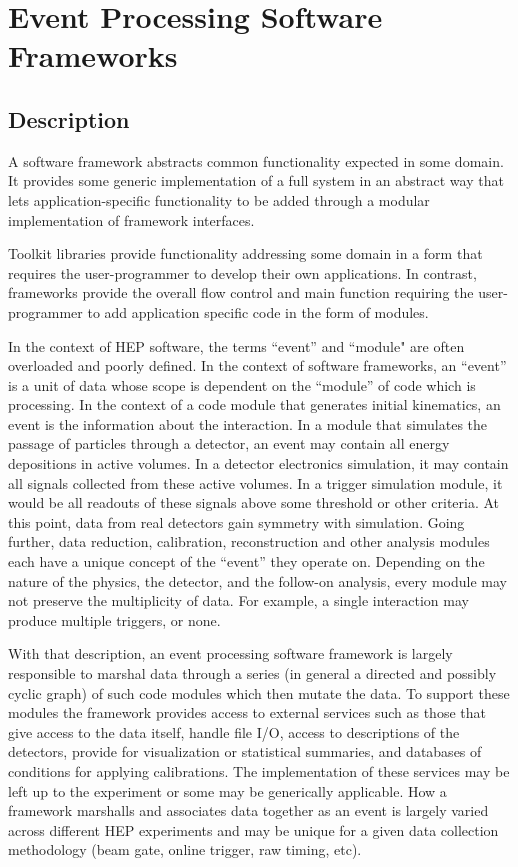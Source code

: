 \section{Event Processing Software Frameworks}

\subsection{Description}

A software framework abstracts common functionality expected in some
domain.  It provides some generic implementation of a full system in
an abstract way that lets application-specific functionality to be
added through a modular implementation of framework interfaces.

Toolkit libraries provide functionality addressing some domain in a
form that requires the user-programmer to develop their own
applications.  In contrast, frameworks provide the overall flow
control and main function requiring the user-programmer to add
application specific code in the form of modules.

In the context of HEP software, the terms ``event'' and ``module" are often overloaded and poorly defined.
In the context of software frameworks, an ``event'' is a unit of data whose scope is dependent
on the ``module'' of code which is processing.  In the context of a
code module that generates initial kinematics, an event is the
information about the interaction.  In a module that simulates the
passage of particles through a detector, an event may contain all
energy depositions in active volumes.  In a detector electronics
simulation, it may contain all signals collected from these active
volumes.  In a trigger simulation module, it would be all readouts of
these signals above some threshold or other criteria.  At this point,
data from real detectors gain symmetry with simulation.  Going further,
data reduction, calibration, reconstruction and other analysis modules
each have a unique concept of the ``event'' they operate on.
Depending on the nature of the physics, the detector, and the follow-on
analysis, every module may not preserve the multiplicity of data.  For
example, a single interaction may produce multiple triggers, or none.

With that description, an event processing software framework is
largely responsible to marshal data through a series (in general a
directed and possibly cyclic graph) of such code modules which then mutate the data.  To support
these modules the framework provides access to external services such
as those that give access to the data itself, handle file I/O, access
to descriptions of the detectors, provide for visualization or
statistical summaries, and databases of conditions for applying
calibrations. 
%
The implementation of these services may be left up to the experiment
or some may be generically applicable.
%
How a framework marshalls and associates data together as an event is
largely varied across different HEP experiments and may be unique for
a given data collection methodology (beam gate, online trigger, raw
timing, etc).


